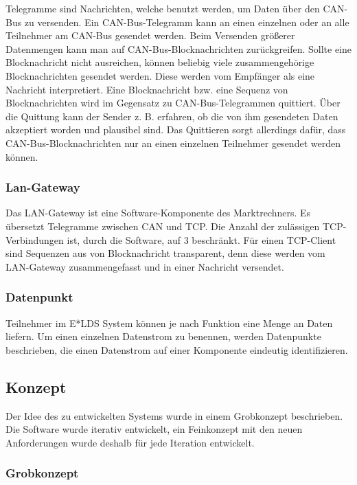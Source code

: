 \documentclass{article}
\begin{document}
Telegramme sind Nachrichten, welche benutzt werden, um Daten über den CAN-Bus zu versenden. Ein CAN-Bus-Telegramm kann an einen einzelnen oder an alle Teilnehmer am CAN-Bus gesendet werden. Beim Versenden größerer Datenmengen kann man auf CAN-Bus-Blocknachrichten zurückgreifen. Sollte eine Blocknachricht nicht ausreichen, können beliebig viele zusammengehörige Blocknachrichten gesendet werden. Diese werden vom Empfänger als eine Nachricht interpretiert. Eine Blocknachricht bzw. eine Sequenz von Blocknachrichten wird im Gegensatz zu CAN-Bus-Telegrammen quittiert. Über die Quittung kann der Sender z. B. erfahren, ob die von ihm gesendeten Daten akzeptiert worden und plausibel sind. Das Quittieren sorgt allerdings dafür, dass CAN-Bus-Blocknachrichten nur an einen einzelnen Teilnehmer gesendet werden können. 

\subsubsection{Lan-Gateway}

Das LAN-Gateway ist  eine Software-Komponente des Marktrechners. Es übersetzt Telegramme zwischen CAN und TCP. Die Anzahl der zulässigen TCP-Verbindungen ist, durch die Software, auf 3 beschränkt. Für einen TCP-Client sind Sequenzen aus von Blocknachricht transparent, denn diese werden vom LAN-Gateway zusammengefasst und in einer Nachricht versendet.

\subsubsection{Datenpunkt}

Teilnehmer im E*LDS System können je nach Funktion eine Menge an Daten liefern. Um einen einzelnen Datenstrom zu benennen, werden Datenpunkte beschrieben, die einen Datenstrom auf einer Komponente eindeutig identifizieren.

\subsection{Konzept}

Der Idee des zu entwickelten Systems wurde in einem Grobkonzept beschrieben. Die Software wurde iterativ entwickelt, ein Feinkonzept mit den neuen Anforderungen wurde deshalb für jede Iteration entwickelt. 

\subsubsection{Grobkonzept}
\end{document}
